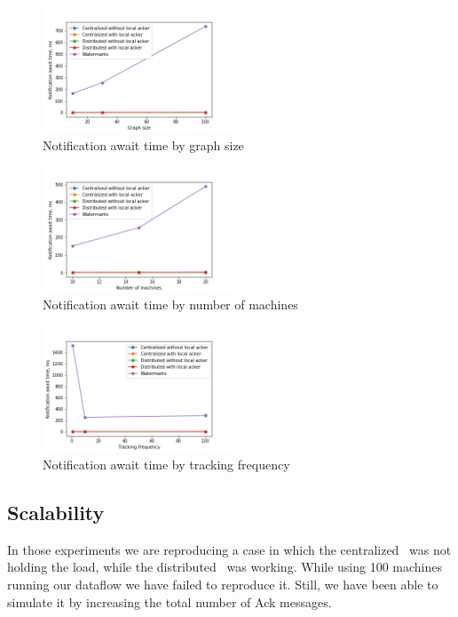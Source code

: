 \begin{figure}[htbp]
  \centering
  \includegraphics[width=0.50\textwidth]{pics/notification_await_time_by_graph_size.png}
  \caption{Notification await time by graph size}
\end{figure}
\begin{figure}[htbp]
  \centering
  \includegraphics[width=0.50\textwidth]{pics/notification_await_time_by_number_of_machines.png}
  \caption{Notification await time by number of machines}
\end{figure}
\begin{figure}[htbp]
  \centering
  \includegraphics[width=0.50\textwidth]{pics/notification_await_time_by_tracking_frequency.png}
  \caption{Notification await time by tracking frequency}
\end{figure}

\subsection{Scalability}

In those experiments we are reproducing a case in which the centralized \tracker\ was not holding the load, while the distributed \tracker\ was working. While using 100 machines running our dataflow we have failed to reproduce it. Still, we have been able to simulate it by increasing the total number of Ack messages.

